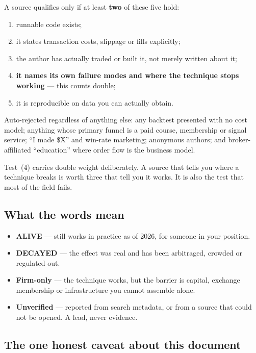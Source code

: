 \documentclass[11pt,a4paper]{article}
\newcommand{\alv}[1]{\textcolor{alive}{\textbf{#1}}}
\newcommand{\dec}[1]{\textcolor{decayed}{\textbf{#1}}}
\begin{document}
A source qualifies only if at least \textbf{two} of these five hold:

\begin{enumerate}
\item runnable code exists;
\item it states transaction costs, slippage or fills explicitly;
\item the author has actually traded or built it, not merely written about it;
\item \textbf{it names its own failure modes and where the technique stops working} --- this counts double;
\item it is reproducible on data you can actually obtain.
\end{enumerate}

Auto-rejected regardless of anything else: any backtest presented with no cost
model; anything whose primary funnel is a paid course, membership or signal
service; ``I made \$X'' and win-rate marketing; anonymous authors; and
broker-affiliated ``education'' where order flow is the business model.

Test~(4) carries double weight deliberately. A source that tells you where a
technique breaks is worth three that tell you it works. It is also the test that
most of the field fails.

\subsection*{What the words mean}

\begin{itemize}
\item \alv{ALIVE} --- still works in practice as of 2026, for someone in your position.
\item \dec{DECAYED} --- the effect was real and has been arbitraged, crowded or regulated out.
\item \textbf{Firm-only} --- the technique works, but the barrier is capital, exchange membership or infrastructure you cannot assemble alone.
\item \textbf{Unverified} --- reported from search metadata, or from a source that could not be opened. A lead, never evidence.
\end{itemize}

\subsection*{The one honest caveat about this document}
\end{document}
